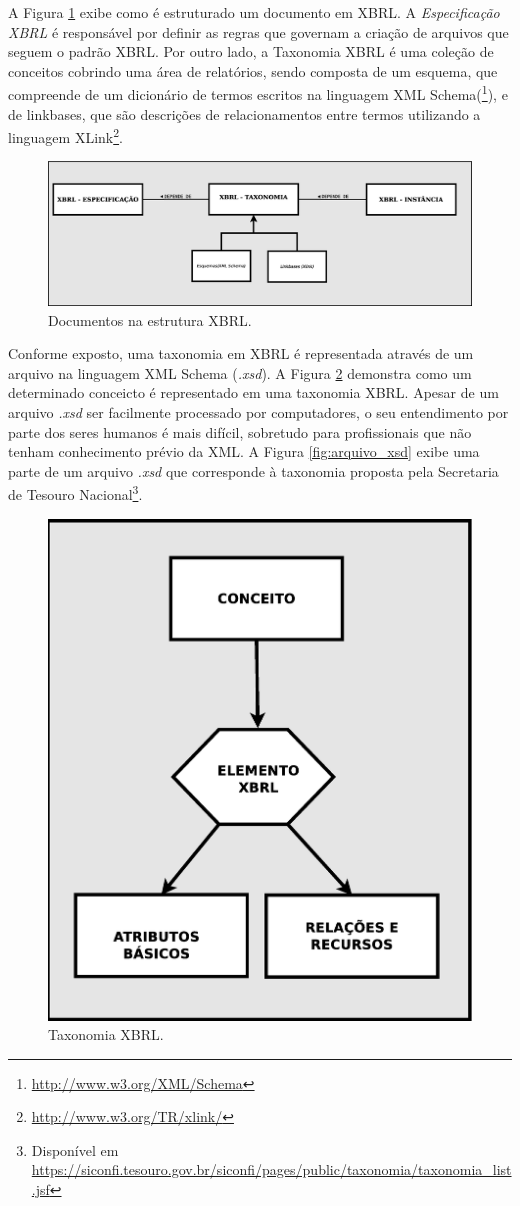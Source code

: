 \documentclass[msc,proposal,hidelot,hideabstract]{ppgccufmg} %
\begin{document}
A Figura \ref{fig:docs_xbrl} exibe como é estruturado um documento em XBRL. A \textit{Especificação XBRL} é responsável por definir as regras que governam a criação de arquivos
que seguem o padrão XBRL. Por outro lado, a Taxonomia XBRL é uma coleção de conceitos cobrindo uma área
de relatórios, sendo composta de um esquema, que compreende de um dicionário de termos escritos na linguagem XML Schema(\footnote{\url{http://www.w3.org/XML/Schema}}), e de linkbases, que são descrições de relacionamentos entre termos utilizando a linguagem XLink\footnote{\url{http://www.w3.org/TR/xlink/}}.

\begin{figure}[hbtp]
\centering
\includegraphics[width=1.0\textwidth]{img/documentos_in_xbrl.eps}
\caption{Documentos na estrutura XBRL.}
\label{fig:docs_xbrl}
\end{figure}

Conforme exposto, uma taxonomia em XBRL é representada através de um arquivo na linguagem XML Schema (\textit{.xsd}). A Figura \ref{fig:taxonomia_xbrl} demonstra como um determinado conceicto é representado em uma taxonomia XBRL. Apesar de um arquivo \textit{.xsd} ser facilmente processado por computadores, o seu entendimento por parte dos seres humanos é mais difícil, sobretudo para profissionais que não tenham conhecimento prévio da XML. A Figura \ref{fig:arquivo_xsd} exibe uma parte de um arquivo \textit{.xsd} que corresponde à taxonomia proposta pela Secretaria de Tesouro Nacional\footnote{Disponível em \url{https://siconfi.tesouro.gov.br/siconfi/pages/public/taxonomia/taxonomia_list.jsf}}. 

\begin{figure}[hbtp]
\centering
\includegraphics[width=.5\textwidth]{img/taxonomia.eps}
\caption{Taxonomia XBRL.}
\label{fig:taxonomia_xbrl}
\end{figure}
\end{document}
